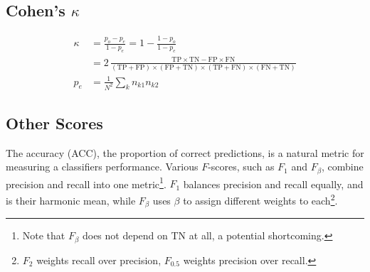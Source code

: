 \subsection{Cohen's \texorpdfstring{$\kappa$}{Kappa}}
\label{ml_general:eval:cohens_kappa}

\begin{subequations} \label{eq:cohens_kappa}
\begin{align}
\kappa &= \frac{p_{o} - p_{e}}{1-p_{e}} = 1 - \frac{1-p_{o}}{1-p_{e}} \label{eq:cohens_kappa:def} \\
&= 2\, \frac{\text{TP} \times \text{TN} - \text{FP} \times \text{FN} }{ \left(\text{TP} + \text{FP}\right) \times \left(\text{FP} + \text{TN}\right) \times \left(\text{TP} + \text{FN}\right) \times \left(\text{FN} + \text{TN}\right) } \label{eq:cohens_kappa:cm} \\
p_{e} &= \frac{1}{N^{2}} \sum_{k} n_{k1} n_{k2} \label{eq:cohens_kappa:pe}
\end{align}
\end{subequations}

\subsection{Other Scores}
\label{ml_general:eval:other_scores}

The accuracy (ACC), the proportion of correct predictions, is a natural metric for measuring a classifiers performance.
Various $F$-scores, such as $F_{1}$ and $F_{\beta}$, combine precision and recall into one metric\footnote{Note that $F_{\beta}$ does not depend on TN at all, a potential shortcoming.}.
$F_{1}$ balances precision and recall equally, and is their harmonic mean,
while $F_{\beta}$ uses $\beta$ to assign different weights to each\footnote{$F_{2}$ weights recall over precision, $F_{0.5}$ weights precision over recall.}.

